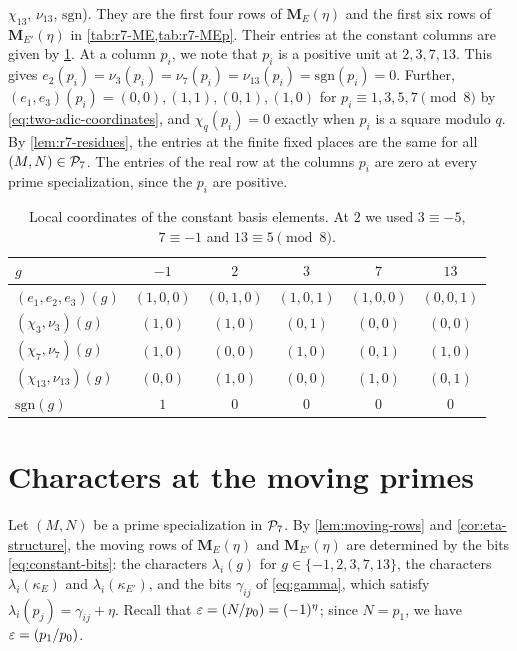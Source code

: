 $\chi_{13}$, $\nu_{13}$, $\mathrm{sgn}$). They are the first four rows of
$\mathbf M_E(\eta)$ and the first six rows of $\mathbf M_{E'}(\eta)$ in \cref{tab:r7-ME,tab:r7-MEp}. Their entries at the
constant columns are given by \cref{tab:r7-coords}. At a column $p_i$, we
note that $p_i$ is a positive unit at $2,3,7,13$. This gives
$e_2(p_i)=\nu_3(p_i)=\nu_7(p_i)=\nu_{13}(p_i)=\mathrm{sgn}(p_i)=0$.
Further, $(e_1,e_3)(p_i)=(0,0),(1,1),(0,1),(1,0)$ for
$p_i\equiv1,3,5,7\pmod8$ by \eqref{eq:two-adic-coordinates}, and
$\chi_q(p_i)=0$ exactly when $p_i$ is a square modulo $q$. By
\cref{lem:r7-residues}, the entries at the finite fixed places are the
same for all $(M,N)\in\mathcal P_7$. The entries of the real row at the columns
$p_i$ are zero at every prime specialization, since the $p_i$ are positive.

\begin{table}[htbp]
\centering
\caption{Local coordinates of the constant basis elements. At $2$ we used
$3\equiv-5$, $7\equiv-1$ and $13\equiv5\pmod8$.}
\label{tab:r7-coords}
\begin{tabular}{lccccc}
\toprule
$g$ & $-1$ & $2$ & $3$ & $7$ & $13$\\
\midrule
$(e_1,e_2,e_3)(g)$ & $(1,0,0)$ & $(0,1,0)$ & $(1,0,1)$ & $(1,0,0)$ & $(0,0,1)$\\
$(\chi_3,\nu_3)(g)$ & $(1,0)$ & $(1,0)$ & $(0,1)$ & $(0,0)$ & $(0,0)$\\
$(\chi_7,\nu_7)(g)$ & $(1,0)$ & $(0,0)$ & $(1,0)$ & $(0,1)$ & $(1,0)$\\
$(\chi_{13},\nu_{13})(g)$ & $(0,0)$ & $(1,0)$ & $(0,0)$ & $(1,0)$ & $(0,1)$\\
$\mathrm{sgn}(g)$ & $1$ & $0$ & $0$ & $0$ & $0$\\
\bottomrule
\end{tabular}
\end{table}

\section{Characters at the moving primes}\label{sec:r7-characters}

Let $(M,N)$ be a prime specialization in $\mathcal P_7$. By \cref{lem:moving-rows}
and \cref{cor:eta-structure}, the moving rows of $\mathbf M_E(\eta)$ and
$\mathbf M_{E'}(\eta)$ are determined by the bits \eqref{eq:constant-bits}:
the characters $\lambda_i(g)$ for $g\in\{-1,2,3,7,13\}$, the characters
$\lambda_i(\kappa_E)$ and $\lambda_i(\kappa_{E'})$, and the bits
$\gamma_{ij}$ of \eqref{eq:gamma}, which satisfy
$\lambda_i(p_j)=\gamma_{ij}+\eta$. Recall
that $\eps=\leg N{p_0}=(-1)^\eta$; since $N=p_1$, we have
$\eps=\leg{p_1}{p_0}$.

